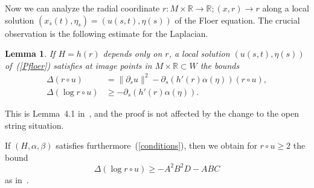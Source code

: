 \documentclass{amsart}
\newcommand{\RR}{\mathbb{R}}
\newtheorem{lemma}[proposition]{Lemma}
\theoremstyle{definition}
\theoremstyle{remark}
\numberwithin{equation}{section}
\begin{document}
Now we can analyze the radial coordinate $r:M\times\RR\to\RR;(x,r)\to r$ along a local solution $(x_s(t),\eta_s)=(u(s,t),\eta(s))$ of the Floer equation. The crucial observation is the following estimate for the Laplacian.
\begin{lemma} 
	If $H=h(r)$ depends only on $r$, a local solution $(u(s,t),\eta(s))$ of~(\ref{Pfloer}) satisfies at image points in $M\times\RR\subset W$ the bounds 
	\begin{align*}
		\Delta (r\circ u)&= \|\partial_s u\|^2-\partial_s(h'(r)\alpha(\eta)) (r\circ u),\\
		\Delta (\log r\circ u)&\geq -\partial_s(h'(r)\alpha(\eta)).
	\end{align*}
\end{lemma}
	This is Lemma~4.1 in~\cite{CFO10}, and the proof is not affected by the change to the open string situation.

If $(H,\alpha,\beta)$ satisfies furthermore~(\ref{conditions}), then we obtain for $r\circ u\geq2$ the bound 
\begin{equation}\label{laplaceestimate}
	 \Delta(\log r\circ u)\geq -A^2B^2D-ABC
\end{equation}
as in~\cite[Lemma~4.2]{CFO10}. 
\end{document}

